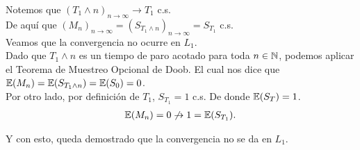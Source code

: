 	Notemos que $(T_1 \wedge n)_{n \rightarrow \infty} \rightarrow T_1$ c.s.\\
	
	De aquí que $(M_n)_{n \rightarrow \infty} = (S_{T_1 \wedge n})_{n \rightarrow \infty} = S_{T_1}$ c.s. \\				
	
	Veamos que la convergencia no ocurre en $L_1$. \\
				
	Dado que $T_1 \wedge n$ es un tiempo de paro acotado para toda $n \in \mathbb{N}$,
	podemos aplicar el Teorema de Muestreo Opcional de 	Doob. 
	El cual nos dice que $\mathbb{E}(M_n) = \mathbb{E}(S_{T_1 \wedge n}) = \mathbb{E}(S_0) = 0$.\\
	
	Por otro lado, por definición de $T_1$, $S_{T_1} = 1$ c.s.	De donde $\mathbb{E}(S_T) = 1$.\\
	
	\begin{align}
		\mathbb{E}(M_n) = 0 \not\rightarrow 1 = \mathbb{E}(S_{T_1}).
	\end{align}			
	
	Y con esto, queda demostrado que la convergencia no se da en $L_1$.\\
	
